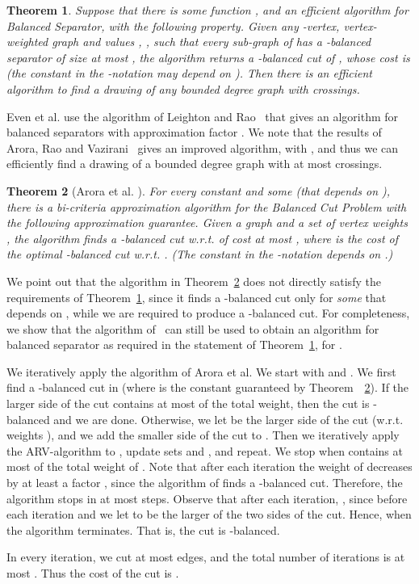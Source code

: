 \documentclass[twoside,leqno,twocolumn]{article}
\newtheorem{theorem}{Theorem}
\begin{document}
\begin{theorem}\label{lem:ARV-corollary}
Suppose that there is some function , and an efficient algorithm for Balanced Separator, with the following property. Given any -vertex, vertex-weighted graph  and values , , such that every sub-graph of  has a -balanced separator of size at most , the algorithm returns a -balanced cut of , whose cost is  (the constant in the -notation may depend on ).   Then there is an efficient algorithm to find a drawing of any bounded degree graph  with  crossings.
\end{theorem}
Even et al. use the algorithm of Leighton and Rao~\cite{LR} that gives an algorithm for balanced separators with approximation factor . We note that the results of Arora, Rao and Vazirani~\cite{ARV} gives an improved algorithm, with , and thus we can efficiently find a drawing of a bounded degree graph with at most  crossings. 
\begin{theorem}[Arora et al. \cite{ARV}]\label{thm:ARV-alg}
For every constant  and some  (that depends on ), there is a bi-criteria approximation algorithm for the Balanced Cut Problem with the following approximation guarantee. Given a graph  and a set of vertex weights , the algorithm finds a -balanced cut w.r.t.  of cost at most , where  is the cost of the optimal -balanced cut w.r.t. . (The constant in the -notation depends on .)
\end{theorem}
We point out that the algorithm in Theorem~\ref{thm:ARV-alg} does not directly satisfy the requirements of Theorem~\ref{lem:ARV-corollary}, since it finds a -balanced cut only for \textit{some}  that depends on , while we are required to produce a -balanced cut.
For completeness, we show that the algorithm of~\cite{ARV} can still be used to obtain an algorithm for balanced separator as required in the statement of Theorem~\ref{lem:ARV-corollary}, for .

We iteratively apply the algorithm of Arora et al. We start with  and . We first find a -balanced cut in  
(where  is the constant guaranteed by Theorem~~\ref{thm:ARV-alg}). If the larger side of the cut contains at most  of the total weight,
then the cut is -balanced and we are done. Otherwise, we let  be the larger side of the cut (w.r.t. weights ),
and we add the smaller side of the cut to . Then we iteratively apply the ARV-algorithm to , update sets  and , and repeat.
We stop when  contains at most  of the total weight of . Note that after each iteration the weight of  decreases 
by at least a factor , since the algorithm of \cite{ARV} finds a -balanced cut. Therefore, the algorithm stops in at most 
 steps. Observe that after each iteration, , since before each iteration
 and we let  to be the larger of the two sides of the cut. Hence, 
when the algorithm terminates. That is, the cut  is -balanced. 

In every iteration, we cut at most  edges, and the total number of iterations is at most .
Thus the cost of the cut is .

\fi
\end{document}
